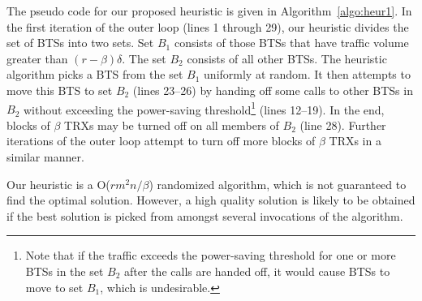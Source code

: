The pseudo code for our proposed heuristic is given in Algorithm~\ref{algo:heur1}. In the first iteration of the outer loop (lines 1 through 29), our heuristic divides the set of BTSs into two sets.
Set $B_1$ consists of those BTSs that have traffic volume greater than $(r-\beta)\delta$. The set $B_2$ consists of all other BTSs.
The heuristic algorithm picks a BTS from the set $B_1$ uniformly at random.
It then attempts to move this BTS to set $B_2$ (lines 23--26) by handing off some calls to other BTSs in $B_2$ without exceeding the power-saving threshold\footnote{Note that if the traffic exceeds the power-saving threshold for one or more BTSs in the set $B_2$ after the calls are handed off, it would cause BTSs to move to set $B_1$, which is undesirable.} (lines 12--19).
In the end, blocks of $\beta$ TRXs may be turned off on all members of $B_2$ (line 28).
Further iterations of the outer loop attempt to turn off more blocks of $\beta$ TRXs in a similar manner.

Our heuristic is a O($rm^2n/\beta$) randomized algorithm, which is not guaranteed to find the optimal solution. However, a high quality solution is likely to be obtained if the best solution is picked from amongst several invocations of the algorithm.

